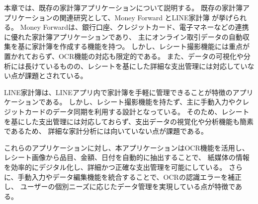 \documentclass[main]{subfiles}
\begin{document}


本章では、既存の家計簿アプリケーションについて説明する。
既存の家計簿アプリケーションの関連研究として、Money Forward \cite{}とLINE家計簿\cite{} が挙げられる。
Money Forwardは、銀行口座、クレジットカード、電子マネーなどの連携に優れた家計簿アプリケーションであり、
主にオンライン取引データの自動収集を基に家計簿を作成する機能を持つ。
しかし、レシート撮影機能には重点が置かれておらず、OCR機能の対応も限定的である。
また、データの可視化や分析には長けているものの、レシートを基にした詳細な支出管理には対応していない点が課題とされている\cite{MoneyForwardApp}。

LINE家計簿は、LINEアプリ内で家計簿を手軽に管理できることが特徴のアプリケーションである。
しかし、レシート撮影機能を持たず、主に手動入力やクレジットカードのデータ同期を利用する設計となっている。
そのため、レシートを基にした支出管理には対応しておらず、支出データの視覚化や分析機能も簡素であるため、
詳細な家計分析には向いていない点が課題である\cite{LINEKakeibo}。

これらのアプリケーションに対し、本アプリケーションはOCR機能を活用し、レシート画像から品目、金額、日付を自動的に抽出することで、
紙媒体の情報を効率的にデジタル化し、詳細かつ正確な支出管理を可能にしている。
さらに、手動入力やデータ編集機能を統合することで、OCRの認識エラーを補正し、
ユーザーの個別ニーズに応じたデータ管理を実現している点が特徴である。

\end{document}
